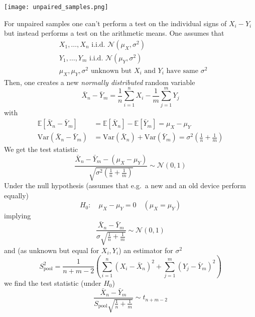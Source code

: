 \begin{center}
    \texttt{[image: unpaired\_samples.png]}
\end{center}

\newpar{}
For unpaired samples one can't perform a test on the individual signs of $X_i-Y_i$ but instead performs a test on the arithmetic means. One assumes that
\begin{align*}
     & X_1,\dots,X_n\text{ i.i.d. }\mathcal{N}(\mu_X,\sigma^2)                       \\
     & Y_1,\dots,Y_m\text{ i.i.d. }\mathcal{N}(\mu_Y,\sigma^2)                       \\
     & \mu_X,\mu_Y,\sigma^2 \text{ unknown but $X_i$ and $Y_i$ have same $\sigma^2$}
\end{align*}
Then, one creates a new \textit{normally distributed} random variable
\begin{equation*}
    \bar{X}_n-\bar{Y}_m=\frac{1}{n}\sum_{i=1}^{n} X_i-\frac{1}{m}\sum_{j=1}^{m} Y_j
\end{equation*}
with
\begin{align*}
    \mathbb{E}[\bar{X}_n-\bar{Y}_m]   & =\mathbb{E}[\bar{X}_n]-\mathbb{E}[\bar{Y}_m]=\mu_X-\mu_Y                                                                            \\
    \mathrm{Var}(\bar{X}_n-\bar{Y}_m) & =\mathrm{Var}(\bar{X}_n)+\mathrm{Var}(\bar{Y}_m)=\sigma^2\left(\frac{1}{n}+\frac{1}{m}\right)
\end{align*}
We get the test statistic
\begin{equation*}
    \frac{\bar{X}_n-\bar{Y}_m-(\mu_X-\mu_Y)}{\sqrt{\sigma^2\left(\frac{1}{n}+\frac{1}{m}\right)}}\sim\mathcal{N}(0,1)
\end{equation*}
Under the null hypothesis (assumes that e.g.\ a new and an old device perform equally)
\begin{equation*}
    H_0{:}\quad\mu_X-\mu_Y=0\quad(\mu_X=\mu_Y)
\end{equation*}
implying
\begin{equation*}
    \frac{\bar{X}_n-\bar{Y}_m}{\sigma\sqrt{\frac{1}{n}+\frac{1}{m}}}\sim\mathcal{N}(0,1)
\end{equation*}
and (as unknown but equal for $X_i, Y_i$) an estimator for $\sigma^2$
\begin{equation*}
    S_{\text{pool}}^2=\frac{1}{n+m-2}\left(\sum_{i=1}^n(X_i-\bar{X}_n)^2+\sum_{j=1}^m(Y_j-\bar{Y}_m)^2\right)
\end{equation*}
we find the test statistic (under $H_0$)
\begin{equation*}
    \frac{\bar{X}_n-\bar{Y}_m}{S_\text{pool}\sqrt{\frac1n+\frac1m}}\sim t_{n+m-2}
\end{equation*}

